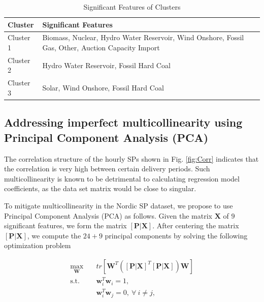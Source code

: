 \documentclass{article}
\begin{document}
\begin{table}[t!]
\centering
\caption{Significant Features of Clusters}
\label{tab:Drivers}
\begin{tabular}{lp{8cm}}  %
\toprule
\textbf{Cluster} & \textbf{Significant Features} \\  %
\midrule
Cluster 1 & Biomass, Nuclear, Hydro Water Reservoir, Wind Onshore, Fossil Gas, Other, Auction Capacity Import \\
Cluster 2 & Hydro Water Reservoir, Fossil Hard Coal \\
Cluster 3 & Solar, Wind Onshore, Fossil Hard Coal \\
\bottomrule
\end{tabular}
\end{table}


\subsection{Addressing imperfect multicollinearity using Principal Component Analysis (PCA)}
The correlation structure of the hourly SPs shown in Fig. \ref{fig:Corr} indicates that the correlation is very high between certain delivery periods. Such multicollinearity is known to be detrimental to calculating regression model coefficients, as the data set matrix would be close to singular. 

To mitigate multicollinearity in the Nordic SP dataset, we propose to use Principal Component Analysis (PCA) as follows. Given the matrix $\mathbf{X}$ of $9$ significant features, we form the matrix $
[\mathbf{P}|\mathbf{X}]$. After centering the matrix $
[\mathbf{P}|\mathbf{X}]$, we compute the $24 + 9$ principal components by solving the following optimization problem 

\begin{subequations} \label{pca:opt}
\begin{align} 
    \max_{\boldsymbol{W}}&\quad tr[\boldsymbol{W}^T ([\mathbf{P}|\mathbf{X}]^T[\mathbf{P}|\mathbf{X}]) \boldsymbol{W}] \\ 
    \text{s.t.} &\quad\boldsymbol{w}_i^T\boldsymbol{w}_i = 1, \label{pca:opt1} \\
    &\quad \boldsymbol{w}_i^T\boldsymbol{w}_j = 0,~\forall~i\neq j, \label{pca:opt2}
\end{align}
\end{subequations}
\end{document}
